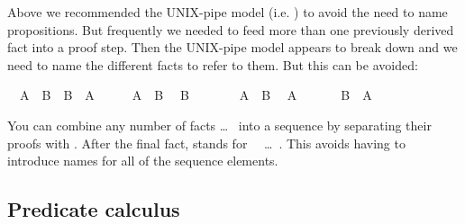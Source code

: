 \begin{isabellebody}
\begin{isamarkuptext}
Above we recommended the UNIX-pipe model (i.e. ) to avoid
the need to name propositions. But frequently we needed to feed more
than one previously derived fact into a proof step. Then the UNIX-pipe
model appears to break down and we need to name the different facts to
refer to them. But this can be avoided:%
\end{isamarkuptext}%
\isamarkuptrue%
\isamarkupfalse%
\ \ {\isachardoublequoteopen}A\ {\isasymand}\ B{\isachardoublequoteclose}\ \ {\isachardoublequoteopen}B\ {\isasymand}\ A{\isachardoublequoteclose}\isanewline
%
\isadelimproof
%
\endisadelimproof
%
\isatagproof
{}\isamarkupfalse%
\ {\isacharminus}\isanewline
\ \ \isamarkupfalse%
\ {\isacharbackquoteopen}A\ {\isasymand}\ B{\isacharbackquoteclose}\ \isamarkupfalse%
\ {\isachardoublequoteopen}B{\isachardoublequoteclose}\ \isacommand{{\isachardot}{\isachardot}}\isamarkupfalse%
\isanewline
\ \ \isamarkupfalse%
\isanewline
\ \ \isamarkupfalse%
\ {\isacharbackquoteopen}A\ {\isasymand}\ B{\isacharbackquoteclose}\ \isamarkupfalse%
\ {\isachardoublequoteopen}A{\isachardoublequoteclose}\ \isacommand{{\isachardot}{\isachardot}}\isamarkupfalse%
\isanewline
\ \ \isamarkupfalse%
\ \isamarkupfalse%
\ {\isachardoublequoteopen}B\ {\isasymand}\ A{\isachardoublequoteclose}\ \isacommand{{\isachardot}{\isachardot}}\isamarkupfalse%
\isanewline
{}\isamarkupfalse%
%
\endisatagproof
{\isafoldproof}%
%
\isadelimproof
%
\endisadelimproof
%
\begin{isamarkuptext}%
\noindent You can combine any number of facts  \dots\  into a sequence by separating their proofs with
. After the final fact,  stands
for ~~\dots~.  This avoids having to
introduce names for all of the sequence elements.


\subsection{Predicate calculus}


\end{isamarkuptext}
\end{isabellebody}
